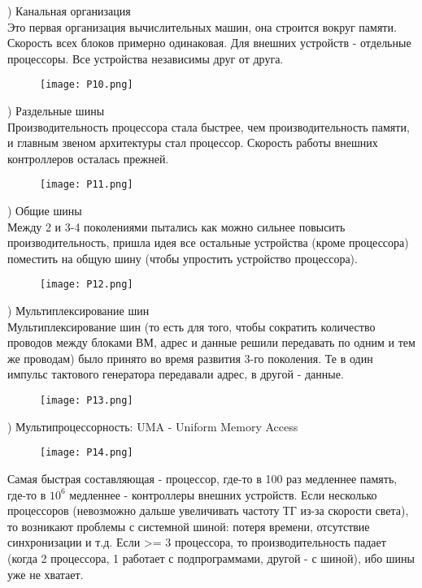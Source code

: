 ) Канальная организация  \\
Это первая организация вычислительных машин, она строится вокруг памяти. Скорость всех блоков примерно одинаковая. Для внешних устройств - отдельные процессоры. Все устройства независимы друг от друга. 
\begin{figure}[H]
    \centering   \texttt{[image: P10.png]}
\end{figure} \newpage

) Раздельные шины \\
Производительность процессора стала быстрее, чем производительность памяти, и главным звеном архитектуры стал процессор. Скорость работы внешних контроллеров осталась прежней. \\
\begin{figure}[H]
    \centering
    \texttt{[image: P11.png]}
\end{figure} 

) Общие шины \\
Между 2 и 3-4 поколениями пытались как можно сильнее повысить производительность, пришла идея все остальные устройства (кроме процессора) поместить на общую шину (чтобы упростить устройство процессора). 
\begin{figure}[H]
    \centering
\texttt{[image: P12.png]}
\end{figure}
) Мультиплексирование шин \\
Мультиплексирование шин (то есть для того, чтобы сократить количество проводов между блоками ВМ, адрес и данные решили передавать по одним и тем же проводам) было принято во время развития 3-го поколения. Те в один импульс тактового генератора передавали адрес, в другой - данные. \\
\begin{figure}[H]
    \centering
\texttt{[image: P13.png]}
\end{figure}

) Мультипроцессорность: UMA - Uniform Memory
Access \\
\begin{figure}[H]
    \centering
    \texttt{[image: P14.png]}
\end{figure}
\noindent Самая быстрая составляющая - процессор, где-то в 100 раз медленнее память, где-то в $10^6$ медленнее - контроллеры внешних устройств. Если несколько процессоров (невозможно дальше увеличивать частоту ТГ из-за скорости света), то возникают проблемы с системной шиной: потеря времени, отсутствие синхронизации и т.д. Если >= 3 процессора, то производительность падает (когда 2 процессора, 1 работает с подпрограммами, другой - с шиной), ибо шины уже не хватает. \\

